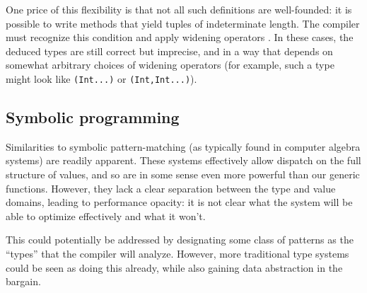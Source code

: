 \documentclass[preprint]{sigplanconf}
\newcommand{\code}[1]{\texttt{#1}}
\begin{document}
One price of this flexibility is that not all such definitions are well-founded:
it is possible to write methods that yield tuples of indeterminate length.
The compiler must recognize this condition and apply widening operators
\cite{Cousot:1977, widening}. In these cases, the deduced types are
still correct but imprecise, and in a way that depends on somewhat arbitrary
choices of widening operators (for example, such a type might look
like \code{(Int...)} or \code{(Int,Int...)}).


\subsection{Symbolic programming}

Similarities to symbolic pattern-matching (as typically found in
computer algebra systems) are readily apparent. These systems effectively
allow dispatch on the full structure of values, and so are in some sense
even more powerful than our generic functions. However, they lack a clear
separation between the type and value domains, leading to performance
opacity: it is not clear what the system will be able to optimize
effectively and what it won't.

This could potentially be addressed by
designating some class of patterns as the ``types'' that the compiler
will analyze. However, more traditional type systems could be seen as
doing this already, while also gaining data abstraction in the bargain.




\end{document}

